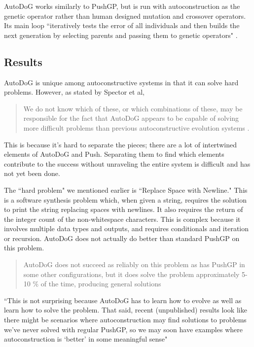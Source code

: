 \documentclass{sig-alternate}
\begin{document}
AutoDoG works similarly to PushGP, but is run with autoconstruction as the genetic operator rather than human designed mutation and crossover operators. Its main loop ``iteratively tests the error of all individuals and then builds the next generation by selecting parents and passing them to genetic operators" \cite{spector:2016}.


\subsection{Results}
\label{sec:results}
AutoDoG is unique among autoconstructive systems in that it can solve hard problems. However, as stated by Spector et al,
\begin{quotation}
	We do not know which of these, or which combinations of these, may be responsible for the fact that AutoDoG appears to be capable of solving more difficult problems than previous autoconstructive evolution systems \cite{spector:2016}.
\end{quotation}
This is because it's hard to separate the pieces; there are a lot of intertwined elements of AutoDoG and Push. Separating them to find which elements contribute to the success without unraveling the entire system is difficult and has not yet been done.

The ``hard problem" we mentioned earlier is ``Replace Space with Newline." This is a software synthesis problem which, when given a string, requires the solution to print the string replacing spaces with newlines. It also requires the return of the integer count of the non-whitespace characters. This is complex because it involves multiple data types and outputs, and requires conditionals and iteration or recursion.
AutoDoG does not actually do better than standard PushGP on this problem.
\begin{quotation}
	AutoDoG does not succeed as reliably on this problem as has PushGP in some other configurations, but it does solve the problem approximately 5-10 \% of the time, producing general solutions \cite{spector:2016}
\end{quotation}

``This is not surprising because AutoDoG has to learn how to evolve as well as learn how to solve the problem. That said, recent (unpublished) results look like there might be scenarios where autoconstruction may find solutions to problems we've never solved with regular PushGP, so we may soon have examples where autoconstruction is `better' in some meaningful sense" 
\end{document}
